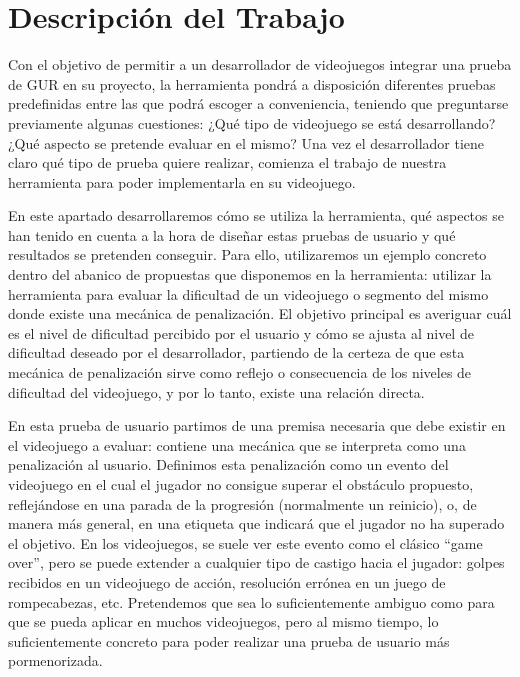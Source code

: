 \chapter{Descripción del Trabajo}
\label{cap:descripcionTrabajo}
Con el objetivo de permitir a un desarrollador de videojuegos integrar una prueba de GUR en su proyecto, la herramienta pondrá a disposición diferentes pruebas predefinidas entre las que podrá escoger a conveniencia, teniendo que preguntarse previamente algunas cuestiones:  ¿Qué tipo de videojuego se está desarrollando? ¿Qué aspecto se pretende evaluar en el mismo? Una vez el desarrollador tiene claro qué tipo de prueba quiere realizar, comienza el trabajo de nuestra herramienta para poder implementarla en su videojuego.


En este apartado desarrollaremos cómo se utiliza la herramienta, qué aspectos se han tenido en cuenta a la hora de diseñar estas pruebas de usuario y qué resultados se pretenden conseguir. Para ello, utilizaremos un ejemplo concreto dentro del abanico de propuestas que disponemos en la herramienta: utilizar la herramienta para evaluar la dificultad de un videojuego o segmento del mismo donde existe una mecánica de penalización. El objetivo principal es averiguar cuál es el nivel de dificultad percibido por el usuario y cómo se ajusta al nivel de dificultad deseado por el desarrollador, partiendo de la certeza de que esta mecánica de penalización sirve como reflejo o consecuencia de los niveles de dificultad del videojuego, y por lo tanto, existe una relación directa.


En esta prueba de usuario partimos de una premisa necesaria que debe existir en el videojuego a evaluar: contiene una mecánica que se interpreta como una penalización al usuario. Definimos esta penalización como un evento del videojuego en el cual el jugador no consigue superar el obstáculo propuesto, reflejándose en una parada de la progresión (normalmente un reinicio), o, de manera más general, en una etiqueta que indicará que el jugador no ha superado el objetivo. En los videojuegos, se suele ver este evento como el clásico “game over”, pero se puede extender a cualquier tipo de castigo hacia el jugador: golpes recibidos en un videojuego de acción, resolución errónea en un juego de rompecabezas, etc. Pretendemos que sea lo suficientemente ambiguo como para que se pueda aplicar en muchos videojuegos, pero al mismo tiempo, lo suficientemente concreto para poder realizar una prueba de usuario más pormenorizada. 



